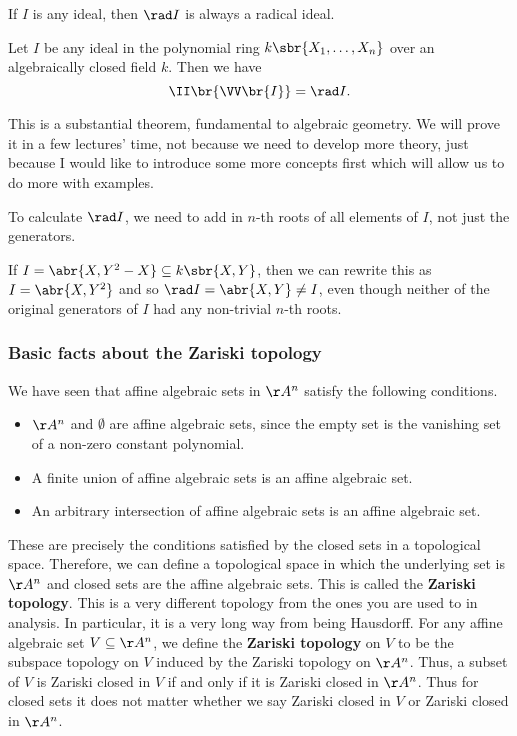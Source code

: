 \begin{note*}
If $ I $ is any ideal, then $ \rad I $ is always a radical ideal.
\end{note*}

\begin{theorem}
\label{thm:strongnullstellensatz}
Let $ I $ be any ideal in the polynomial ring $ k\sbr{X_1, \dots, X_n} $ over an algebraically closed field $ k $. Then we have
$$ \II\br{\VV\br{I}} = \rad I. $$
\end{theorem}

This is a substantial theorem, fundamental to algebraic geometry. We will prove it in a few lectures' time, not because we need to develop more theory, just because I would like to introduce some more concepts first which will allow us to do more with examples.

\begin{note*}
To calculate $ \rad I $, we need to add in $ n $-th roots of all elements of $ I $, not just the generators.
\end{note*}

\begin{example*}
If $ I = \abr{X, Y^2 - X} \subseteq k\sbr{X, Y} $, then we can rewrite this as $ I = \abr{X, Y^2} $ and so $ \rad I = \abr{X, Y} \ne I $, even though neither of the original generators of $ I $ had any non-trivial $ n $-th roots.
\end{example*}

\subsubsection{Basic facts about the Zariski topology}

We have seen that affine algebraic sets in $ \AA^n $ satisfy the following conditions.
\begin{itemize}
\item $ \AA^n $ and $ \emptyset $ are affine algebraic sets, since the empty set is the vanishing set of a non-zero constant polynomial.
\item A finite union of affine algebraic sets is an affine algebraic set.
\item An arbitrary intersection of affine algebraic sets is an affine algebraic set.
\end{itemize}
These are precisely the conditions satisfied by the closed sets in a topological space. Therefore, we can define a topological space in which the underlying set is $ \AA^n $ and closed sets are the affine algebraic sets. This is called the \textbf{Zariski topology}. This is a very different topology from the ones you are used to in analysis. In particular, it is a very long way from being Hausdorff. For any affine algebraic set $ V \subseteq \AA^n $, we define the \textbf{Zariski topology} on $ V $ to be the subspace topology on $ V $ induced by the Zariski topology on $ \AA^n $. Thus, a subset of $ V $ is Zariski closed in $ V $ if and only if it is Zariski closed in $ \AA^n $. Thus for closed sets it does not matter whether we say Zariski closed in $ V $ or Zariski closed in $ \AA^n $.

